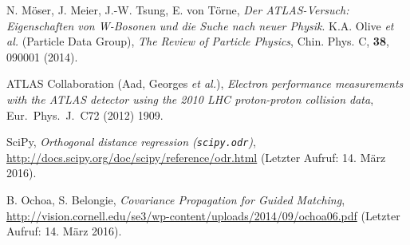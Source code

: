 \documentclass[11pt, a4paper]{article}
\numberwithin{equation}{section}
\begin{document}
\FloatBarrier
\vspace{\fill}
\begin{thebibliography}{19}
	N. Möser, J. Meier, J.-W. Tsung, E. von Törne,
	\emph{Der ATLAS-Versuch: Eigenschaften von W-Bosonen und die Suche nach neuer Physik}.
	K.A. Olive \textit{et al.} (Particle Data Group),
	\emph{The Review of Particle Physics},
	Chin. Phys. C, \textbf{38}, 090001 (2014).

	ATLAS Collaboration (Aad, Georges \textit{et al.}),
	\emph{Electron performance measurements with the ATLAS detector using the 2010 LHC proton-proton collision data},
	Eur.\ Phys.\ J.\ C72 (2012) 1909.

	SciPy,
	\emph{Orthogonal distance regression (\texttt{scipy.odr})},
	\url{http://docs.scipy.org/doc/scipy/reference/odr.html} (Letzter Aufruf: 14. März 2016).

	B. Ochoa, S. Belongie,
	\emph{Covariance Propagation for Guided Matching},
	\url{http://vision.cornell.edu/se3/wp-content/uploads/2014/09/ochoa06.pdf} (Letzter Aufruf: 14. März 2016).
	

\end{thebibliography}
\end{document}

